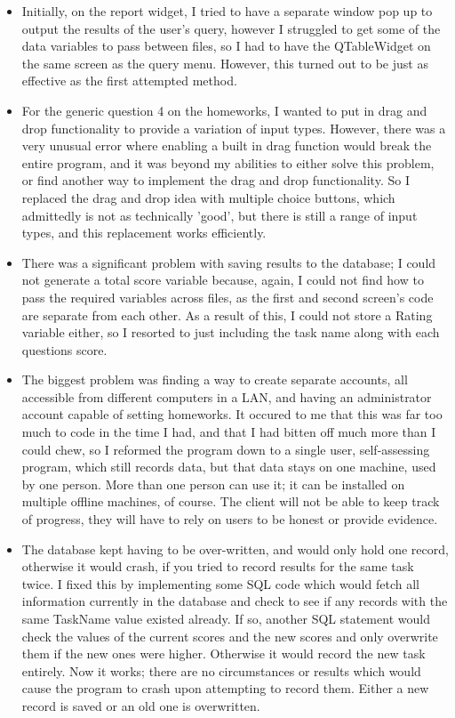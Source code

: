 \begin{itemize}
\item Initially, on the report widget, I tried to have a separate window pop up to output the results of the user's query, however I struggled to get some of the data variables to pass between files, so I had to have the QTableWidget on the same screen as the query menu. However, this turned out to be just as effective as the first attempted method.

\item For the generic question 4 on the homeworks, I wanted to put in drag and drop functionality to provide a variation of input types. However, there was a very unusual error where enabling a built in drag function would break the entire program, and it was beyond my abilities to either solve this problem, or find another way to implement the drag and drop functionality. So I replaced the drag and drop idea with multiple choice buttons, which admittedly is not as technically 'good', but there is still a range of input types, and this replacement works efficiently.

\item There was a significant problem with saving results to the database; I could not generate a total score variable because, again, I could not find how to pass the required variables across files, as the first and second screen's code are separate from each other. As a result of this, I could not store a Rating variable either, so I resorted to just including the task name along with each questions score.

\item The biggest problem was finding a way to create separate accounts, all accessible from different computers in a LAN, and having an administrator account capable of setting homeworks. It occured to me that this was far too much to code in the time I had, and that I had bitten off much more than I could chew, so I reformed the program down to a single user, self-assessing program, which still records data, but that data stays on one machine, used by one person. More than one person can use it; it can be installed  on multiple offline machines, of course. The client will not be able to keep track of progress, they will have to rely on users to be honest or provide evidence.

\item The database kept having to be over-written, and would only hold one record, otherwise it would crash, if you tried to record results for the same task twice. I fixed this by implementing some SQL code which would fetch all information currently in the database and check to see if any records with the same TaskName value existed already. If so, another SQL statement would check the values of the current scores and the new scores and only overwrite them if the new ones were higher. Otherwise it would record the new task entirely. Now it works; there are no circumstances or results which would cause the program to crash upon attempting to record them. Either a new record is saved or an old one is overwritten.

\end{itemize}

